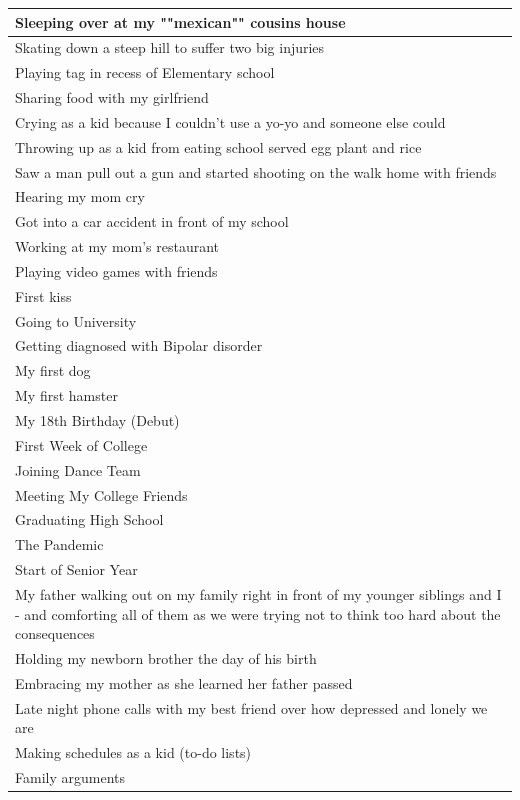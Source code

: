 \documentclass[
  .7em,
  letterpaper,
  DIV=11,
  numbers=noendperiod]{scrartcl}
\begin{document}
\begin{table}
\begin{tabular}{l}
\hline
Sleeping over at my ""mexican"" cousins house\\
\hline
Skating down a steep hill to suffer two big injuries\\
\hline
Playing tag in recess of Elementary school\\
\hline
Sharing food with my girlfriend\\
\hline
Crying as a kid because I couldn't use a yo-yo and someone else could\\
\hline
Throwing up as a kid from eating school served egg plant and rice\\
\hline
Saw a man pull out a gun and started shooting on the walk home with friends\\
\hline
Hearing my mom cry\\
\hline
Got into a car accident in front of my school\\
\hline
Working at my mom's restaurant\\
\hline
Playing video games with friends\\
\hline
First kiss\\
\hline
Going to University\\
\hline
Getting diagnosed with Bipolar disorder\\
\hline
My first dog\\
\hline
My first hamster\\
\hline
My 18th Birthday (Debut)\\
\hline
First Week of College\\
\hline
Joining Dance Team\\
\hline
Meeting My College Friends\\
\hline
Graduating High School\\
\hline
The Pandemic\\
\hline
Start of Senior Year\\
\hline
My father walking out on my family right in front of my younger siblings and I - and comforting all of them as we were trying not to think too hard about the consequences\\
\hline
Holding my newborn brother the day of his birth\\
\hline
Embracing my mother as she learned her father passed\\
\hline
Late night phone calls with my best friend over how depressed and lonely we are\\
\hline
Making schedules as a kid (to-do lists)\\
\hline
Family arguments\\
\hline

\end{tabular}
\end{table}
\end{document}

